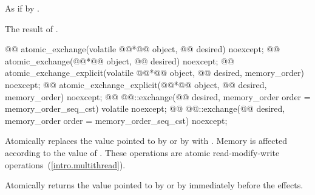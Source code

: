 \begin{itemdescr}
\pnum
\effects As if by .

\pnum
\returns The result of .
\end{itemdescr}


%
%
%
%
%
%
\begin{itemdecl}
@@ atomic_exchange(volatile @@*@\itcorr[-1]@ object, @@ desired) noexcept;
@@ atomic_exchange(@@*@\itcorr[-1]@ object, @@ desired) noexcept;
@@ atomic_exchange_explicit(volatile @@*@\itcorr[-1]@ object, @@ desired, memory_order) noexcept;
@@ atomic_exchange_explicit(@@*@\itcorr[-1]@ object, @@ desired, memory_order) noexcept;
@@ @@::exchange(@@ desired, memory_order order = memory_order_seq_cst) volatile noexcept;
@@ @@::exchange(@@ desired, memory_order order = memory_order_seq_cst) noexcept;
\end{itemdecl}

\begin{itemdescr}
\pnum
\effects Atomically replaces the value pointed to by  or by 
with .
Memory is affected according to the value of .
These operations are atomic read-modify-write operations~(\ref{intro.multithread}).

\pnum
\returns Atomically returns the value pointed to by  or by  immediately before the effects.
\end{itemdescr}

